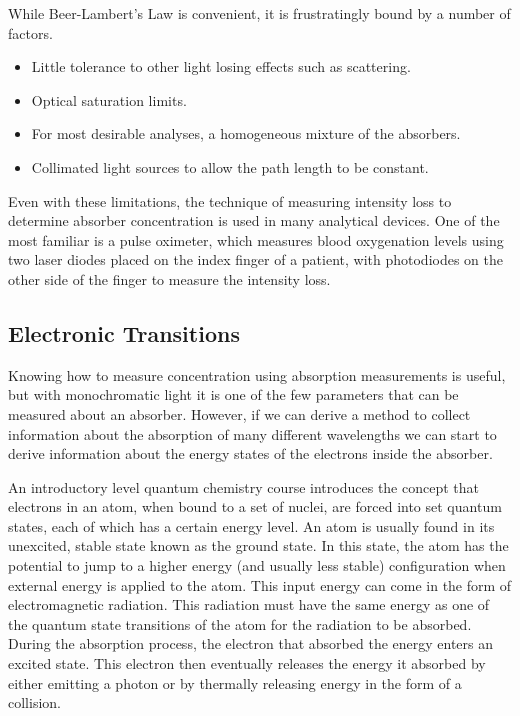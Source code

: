 While Beer-Lambert's Law is convenient, it is frustratingly bound by a number of factors.
\begin{itemize}
  \item Little tolerance to other light losing effects such as scattering.
  \item Optical saturation limits.
  \item For most desirable analyses, a homogeneous mixture of the absorbers.
  \item Collimated light sources to allow the path length to be constant.
\end{itemize}

Even with these limitations, the technique of measuring intensity loss to
determine absorber concentration is used in many analytical devices. One of the
most familiar is a pulse oximeter, which measures blood oxygenation levels
using two laser diodes placed on the index finger of a patient, with
photodiodes on the other side of the finger to measure the intensity
loss.

\subsection{Electronic Transitions}
Knowing how to measure concentration using absorption measurements is useful,
but with monochromatic light it is one of the few parameters that can be
measured about an absorber. However, if we can derive a method to collect
information about the absorption of many different wavelengths we can start to
derive information about the energy states of the electrons inside the absorber.

An introductory level quantum chemistry course introduces the concept that
electrons in an atom, when bound to a set of nuclei, are forced into set
quantum states, each of which has a certain energy level. An atom is usually found in its unexcited, stable state known
as the ground state. In this state, the atom has the potential to jump to a
higher energy (and usually less stable) configuration when external energy is
applied to the atom.  This input energy can come in the form of electromagnetic
radiation. This radiation must have the same energy as one of the quantum state
transitions of the atom for the radiation to be absorbed. During the absorption
process, the electron that absorbed the energy enters an excited state.  This electron then eventually releases the energy it absorbed by either emitting a photon or by thermally releasing energy in the form of a collision.

